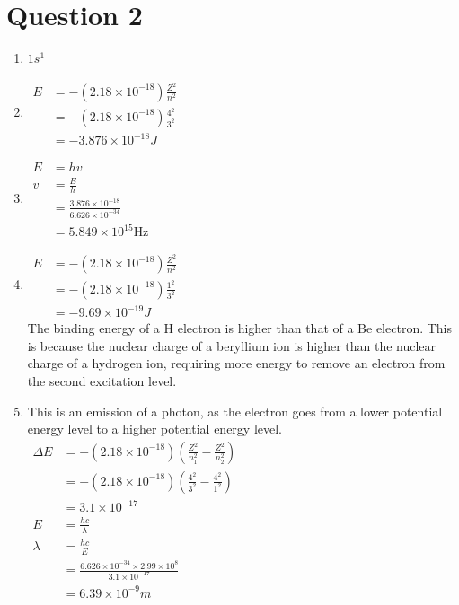\documentclass[a4paper, fleqn]{article}
\begin{document}
\section{Question 2}
\begin{enumerate}[label=(\alph{*})]
\item $1s^1$
\item $\begin{aligned}E&=-(2.18\times10^{-18})\frac{Z^2}{n^2}\\&=-(2.18\times10^{-18})\frac{4^2}{3^2}\\&=-3.876\times10^{-18}J\end{aligned}$
\item $\begin{aligned}E&=hv\\v&=\frac{E}{h}\\&=\frac{3.876\times10^{-18}}{6.626\times10^{-34}}\\&=5.849\times10^{15}\text{Hz}\end{aligned}$
\item $\begin{aligned}E&=-(2.18\times10^{-18})\frac{Z^2}{n^2}\\&=-(2.18\times10^{-18})\frac{1^2}{3^2}\\&=-9.69\times10^{-19}J\end{aligned}$\\
The binding energy of a H electron is higher than that of a Be electron. This is because the nuclear charge of a beryllium ion is higher than the nuclear charge of a hydrogen ion, requiring more energy to remove an electron from the second excitation level.
\item This is an emission of a photon, as the electron goes from a lower potential energy level to a higher potential energy level.\\
$\begin{aligned}\Delta E&=-(2.18\times10^{-18})\left(\frac{Z^2}{n_1^2}-\frac{Z^2}{n_2^2}\right)\\&=-(2.18\times10^{-18})\left(\frac{4^2}{3^2}-\frac{4^2}{1^2}\right)\\&=3.1\times10^{-17}\\E&=\frac{hc}{\lambda}\\\lambda&=\frac{hc}{E}\\&=\frac{6.626\times10^{-34}\times2.99\times10^8}{3.1\times10^{-17}}\\&=6.39\times10^{-9}m\end{aligned}$
\end{enumerate}
\pagebreak
\end{document}
